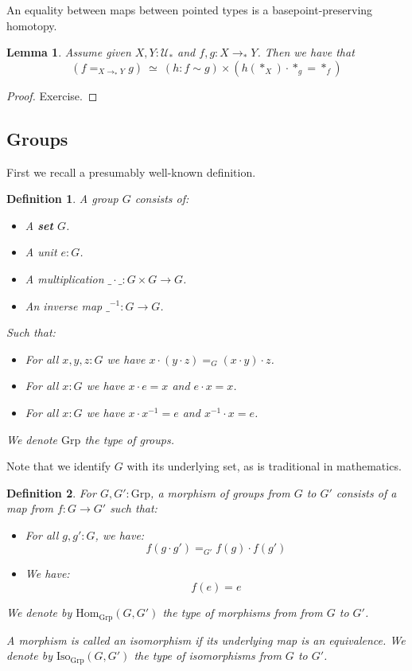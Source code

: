 \documentclass{article}
\newcommand{\sse}[1]{\medbreak \subsection{#1}}
\newcommand{\U}{{\mathcal U}}
\renewcommand{\r}{\rightarrow}
\newcommand{\Grp}{\mathrm{Grp}}
\newcommand{\Hom}{\mathrm{Hom}}
\newcommand{\Iso}{\mathrm{Iso}}
\newtheorem{lemma}{Lemma}
\newtheorem{definition}{Definition}
\begin{document}
An equality between maps between pointed types is a basepoint-preserving homotopy.

\begin{lemma}
Assume given $X,Y:\U_*$ and $f,g:X\r_* Y$. Then we have that 
\[(f=_{X\r_*Y}g) \ \simeq \ (h:f\sim g)\times (h(*_X) \cdot *_g =  *_f) \]
\end{lemma}
\begin{proof}
Exercise.
\end{proof}



\sse{Groups}

First we recall a presumably well-known definition.

\begin{definition}
A group $G$ consists of:
\begin{itemize}
\item A {\bf  set} $G$.
\item A unit $e:G$.
\item A multiplication $\_\cdot\_ : G\times G\r G$.
\item An inverse map $\_^{-1} : G\r G$. 
\end{itemize}
Such that:
\begin{itemize}
\item For all $x,y,z:G$ we have $x\cdot(y\cdot z) =_G (x\cdot y)\cdot z$.
\item For all $x:G$ we have $x\cdot e = x$ and $e\cdot x =x$.
\item For all $x:G$ we have $x\cdot x^{-1} = e$ and $x^{-1}\cdot x = e$.
\end{itemize}
We denote $\Grp$ the type of groups. 
\end{definition}

Note that we identify $G$ with its underlying set, as is traditional in mathematics.

\begin{definition}
For $G,G':\Grp$, a morphism of groups from $G$ to $G'$ consists of a map from $f:G\r G'$ such that:
\begin{itemize}
\item For all $g,g':G$, we have: 
\[f(g\cdot g') =_{G'} f(g)\cdot f(g')\]
\item We have:
\[f(e) = e\]
\end{itemize}
We denote by $\Hom_{\Grp}(G,G')$ the type of morphisms from from $G$ to $G'$. 

A morphism is called an isomorphism if its underlying map is an equivalence. We denote by $\Iso_{\Grp}(G,G')$ the type of isomorphisms from $G$ to $G'$.
\end{definition}
\end{document}
